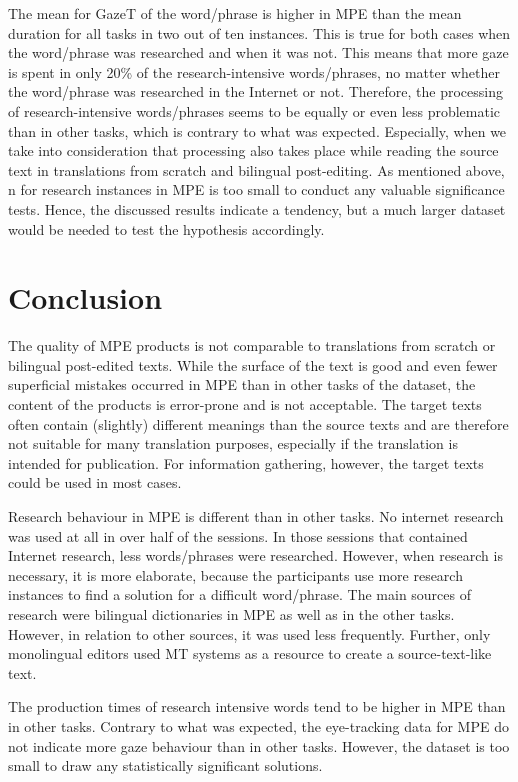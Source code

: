 \documentclass[output=paper]{langsci/langscibook}
\begin{document}
The mean for GazeT of the word/phrase is higher in MPE than the mean duration for all tasks in two out of ten instances. This is true for both cases when the word/phrase was researched and when it was not. This means that more gaze is spent in only 20\% of the research-intensive words/phrases, no matter whether the word/phrase was researched in the Internet or not. Therefore, the processing of research-intensive words/phrases seems to be equally or even less problematic than in other tasks, which is contrary to what was expected. Especially, when we take into consideration that processing also takes place while reading the source text in translations from scratch and bilingual post-editing. As mentioned above, n for research instances in MPE is too small to conduct any valuable significance tests. Hence, the discussed results indicate a tendency, but a much larger dataset would be needed to test the hypothesis accordingly.


\section{Conclusion}

The quality of MPE products is not comparable to translations from scratch or bilingual post-edited texts. While the surface of the text is good and even fewer superficial mistakes occurred in MPE than in other tasks of the dataset, the content of the products is error-prone and is not acceptable. The target texts often contain (slightly) different meanings than the source texts and are therefore not suitable for many translation purposes, especially if the translation is intended for publication. For information gathering, however, the target texts could be used in most cases.


Research behaviour in MPE is different than in other tasks. No internet research was used at all in over half of the sessions. In those sessions that contained Internet research, less words/phrases were researched. However, when research is necessary, it is more elaborate, because the participants use more research instances to find a solution for a difficult word/phrase. The main sources of research were bilingual dictionaries in MPE as well as in the other tasks. However, in relation to other sources, it was used less frequently. Further, only monolingual editors used MT systems as a resource to create a source-text-like text.



The production times of research intensive words tend to be higher in MPE than in other tasks. Contrary to what was expected, the eye-tracking data for MPE do not indicate more gaze behaviour than in other tasks. However, the dataset is too small to draw any statistically significant solutions.
\end{document}
